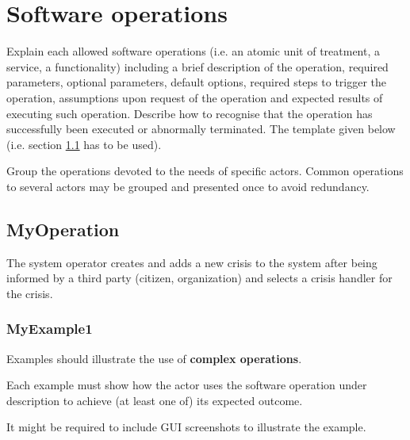 \chapter{Software operations}
\label{chap:soptware_operations}


Explain each allowed software operations (i.e. an atomic unit of treatment, a service, a functionality) including a brief description of the operation, required parameters, optional parameters, default options, required steps to trigger the operation, assumptions upon request of the operation and expected results of executing such operation.
Describe how to recognise that the operation has successfully been executed or
abnormally terminated. The template given below (i.e. section \ref{operation:MyOperation} has to be used).

Group the operations devoted to the needs of specific actors. Common
operations to several actors may be grouped and presented once to avoid redundancy.


\section{MyOperation}
\label{operation:MyOperation}
The system operator creates and adds a new crisis to the system after being
informed by a third party (citizen, organization) and selects a crisis handler for the crisis.
 
\subsection{MyExample1}
Examples should illustrate the use of \textbf{complex operations}.

Each example must show how the actor uses the software operation under
description to achieve (at least one of) its expected outcome.

It might be required to include GUI screenshots to illustrate the example.\\


